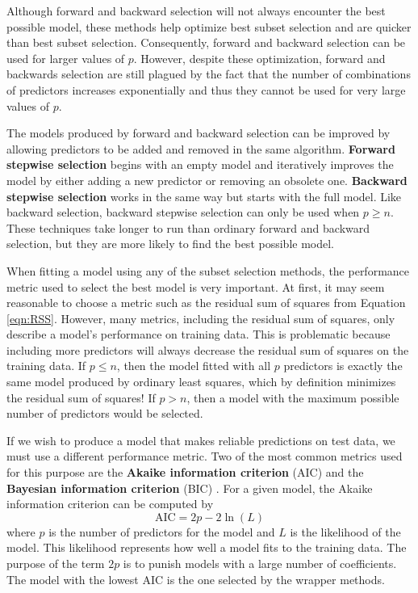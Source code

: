 \documentclass{article}
\begin{document}
	Although forward and backward selection will not always encounter the best possible model, these methods help optimize best subset selection and are quicker than best subset selection. Consequently, forward and backward selection can be used for larger values of $p$. However, despite these optimization, forward and backwards selection are still plagued by the fact that the number of combinations of predictors increases exponentially and thus they cannot be used for very large values of $p$.
	
	The models produced by forward and backward selection can be improved by allowing predictors to be added and removed in the same algorithm. \textbf{Forward stepwise selection} begins with an empty model and iteratively improves the model by either adding a new predictor or removing an obsolete one. \textbf{Backward stepwise selection} works in the same way but starts with the full model. Like backward selection, backward stepwise selection can only be used when $p\geq n$. These techniques take longer to run than ordinary forward and backward selection, but they are more likely to find the best possible model.
	
	When fitting a model using any of the subset selection methods, the performance metric used to select the best model is very important. At first, it may seem reasonable to choose a metric such as the residual sum of squares from Equation \ref{eqn:RSS}. However, many metrics, including the residual sum of squares, only describe a model's performance on training data. This is problematic because including more predictors will always decrease the residual sum of squares on the training data. If $p\leq n$, then the model fitted with all $p$ predictors is exactly the same model produced by ordinary least squares, which by definition minimizes the residual sum of squares! If $p>n$, then a model with the maximum possible number of predictors would be selected.
	
	If we wish to produce a model that makes reliable predictions on test data, we must use a different performance metric. Two of the most common metrics used for this purpose are the \textbf{Akaike information criterion} (AIC) and the \textbf{Bayesian information criterion} (BIC) \cite{akaike1998information, schwarz1978estimating}. For a given model, the Akaike information criterion can be computed by
	\begin{equation}
		\text{AIC} = 2p - 2\ln(L)
	\end{equation}
	where $p$ is the number of predictors for the model and $L$ is the likelihood of the model. This likelihood represents how well a model fits to the training data. The purpose of the term $2p$ is to punish models with a large number of coefficients. The model with the lowest AIC is the one selected by the wrapper methods.
	
\end{document}

